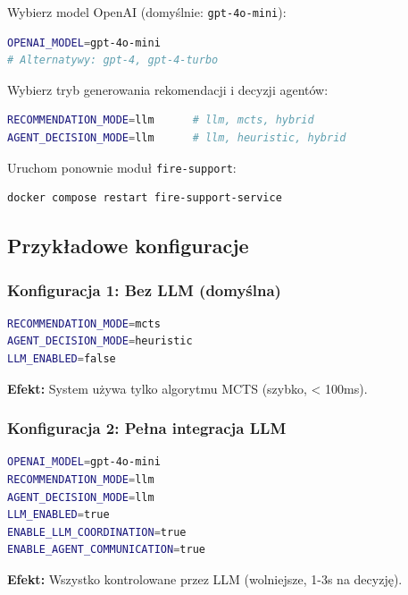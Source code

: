 Wybierz model OpenAI (domyślnie: \texttt{gpt-4o-mini}):

\begin{lstlisting}[language=bash, basicstyle=\small]
OPENAI_MODEL=gpt-4o-mini
# Alternatywy: gpt-4, gpt-4-turbo
\end{lstlisting}

Wybierz tryb generowania rekomendacji i decyzji agentów:

\begin{lstlisting}[language=bash, basicstyle=\small]
RECOMMENDATION_MODE=llm      # llm, mcts, hybrid
AGENT_DECISION_MODE=llm      # llm, heuristic, hybrid
\end{lstlisting}

Uruchom ponownie moduł \texttt{fire-support}:

\begin{lstlisting}[language=bash, basicstyle=\small]
docker compose restart fire-support-service
\end{lstlisting}

\subsection{Przykładowe konfiguracje}

\subsubsection{Konfiguracja 1: Bez LLM (domyślna)}

\begin{lstlisting}[language=bash, basicstyle=\small]
RECOMMENDATION_MODE=mcts
AGENT_DECISION_MODE=heuristic
LLM_ENABLED=false
\end{lstlisting}

\textbf{Efekt:} System używa tylko algorytmu MCTS (szybko, < 100ms).

\subsubsection{Konfiguracja 2: Pełna integracja LLM}

\begin{lstlisting}[language=bash, basicstyle=\small]
OPENAI_MODEL=gpt-4o-mini
RECOMMENDATION_MODE=llm
AGENT_DECISION_MODE=llm
LLM_ENABLED=true
ENABLE_LLM_COORDINATION=true
ENABLE_AGENT_COMMUNICATION=true
\end{lstlisting}

\textbf{Efekt:} Wszystko kontrolowane przez LLM (wolniejsze, 1-3s na decyzję).

